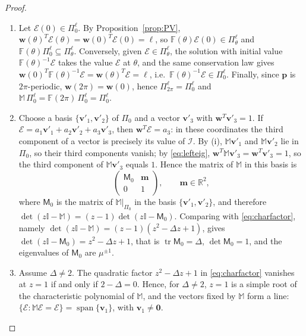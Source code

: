 \documentclass[reqno]{amsart}
\newcommand{\F}{\mathbb{F}}
\newcommand{\tr}{\operatorname{tr}}     %
\begin{document}
\begin{proof}
\begin{enumerate}
\item[(i)] Let $\boldsymbol{\mathcal E}(0)\in\Pi^\ell_0$. By Proposition~\ref{prop:PV}, $\mathbf w(\theta)^T\boldsymbol{\mathcal E}(\theta)=\mathbf w(0)^T\boldsymbol{\mathcal E}(0)=\ell$, so $\F(\theta)\boldsymbol{\mathcal E}(0)\in\Pi^\ell_\theta$ and $\F(\theta)\Pi^\ell_0\subseteq\Pi^\ell_\theta$. Conversely, given $\boldsymbol{\mathcal E}\in\Pi^\ell_\theta$, the solution with initial value $\F(\theta)^{-1}\boldsymbol{\mathcal E}$ takes the value $\boldsymbol{\mathcal E}$ at $\theta$, and the same conservation law gives $\mathbf w(0)^T\F(\theta)^{-1}\boldsymbol{\mathcal E}=\mathbf w(\theta)^T\boldsymbol{\mathcal E}=\ell$, i.e.\ $\F(\theta)^{-1}\boldsymbol{\mathcal E}\in\Pi^\ell_0$. Finally, since $\mathbf p$ is $2\pi$-periodic, $\mathbf w(2\pi)=\mathbf w(0)$, hence $\Pi^\ell_{2\pi}=\Pi^\ell_0$ and $\mathbb M\,\Pi^\ell_0=\F(2\pi)\,\Pi^\ell_0=\Pi^\ell_0$.
\item[(ii)] Choose a basis $\{\mathbf v'_1,\mathbf v'_2\}$ of $\Pi_0$ and a vector $\mathbf v'_3$ with $\mathbf w^T\mathbf v'_3=1$. If $\boldsymbol{\mathcal E}=a_1\mathbf v'_1+a_2\mathbf v'_2+a_3\mathbf v'_3$, then $\mathbf w^T\boldsymbol{\mathcal E}=a_3$: in these coordinates the third component of a vector is precisely its value of $\mathcal I$. By (i), $\mathbb M\mathbf v'_1$ and $\mathbb M\mathbf v'_2$ lie in $\Pi_0$, so their third components vanish; by \eqref{eq:lefteig}, $\mathbf w^T\mathbb M\mathbf v'_3=\mathbf w^T\mathbf v'_3=1$, so the third component of $\mathbb M\mathbf v'_3$ equals $1$. Hence the matrix of $\mathbb M$ in this basis is
\[
\begin{pmatrix}{\mathsf M}_0&\mathbf m\\ 0&1\end{pmatrix},\qquad \mathbf m\in\mathbb R^2,
\]
where ${\mathsf M}_0$ is the matrix of $\mathbb M|_{\Pi_0}$ in the basis $\{\mathbf v'_1,\mathbf v'_2\}$, and therefore $\det(z\mathbb I-\mathbb M)=(z-1)\det(z\mathbb I-{\mathsf M}_0)$. Comparing with \eqref{eq:charfactor}, namely $\det(z\mathbb I-\mathbb M)=(z-1)(z^{2}-\Delta z+1)$, gives $\det(z\mathbb I-{\mathsf M}_0)=z^{2}-\Delta z+1$, that is $\tr{\mathsf M}_0=\Delta$, $\det{\mathsf M}_0=1$, and the eigenvalues of ${\mathsf M}_0$ are $\mu^{\pm1}$.
\item[(iii)] Assume $\Delta\neq2$. The quadratic factor $z^2-\Delta z+1$ in \eqref{eq:charfactor} vanishes at $z=1$ if and only if $2-\Delta=0$. Hence, for $\Delta\neq2$, $z=1$ is a simple root of the characteristic polynomial of $\mathbb M$, and the vectors fixed by $\mathbb M$ form a line: $\{\boldsymbol{\mathcal E}:\mathbb M\boldsymbol{\mathcal E}=\boldsymbol{\mathcal E}\}=\operatorname{span}\{\mathbf v_1\}$, with $\mathbf v_1\neq\mathbf 0$.\\

\end{enumerate}
\end{proof}
\end{document}
